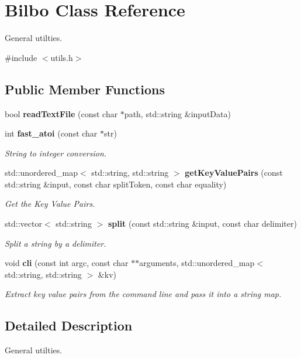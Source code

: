 \section{Bilbo Class Reference}
\label{class_bilbo}


General utilties.  




{\ttfamily \#include $<$utils.\+h$>$}

\subsection*{Public Member Functions}
\begin{DoxyCompactItemize}
\item 
bool \textbf{ read\+Text\+File} (const char $\ast$path, std\+::string \&input\+Data)
\item 
int \textbf{ fast\+\_\+atoi} (const char $\ast$str)
\begin{DoxyCompactList}\small\item\em String to integer conversion. \end{DoxyCompactList}\item 
std\+::unordered\+\_\+map$<$ std\+::string, std\+::string $>$ \textbf{ get\+Key\+Value\+Pairs} (const std\+::string \&input, const char split\+Token, const char equality)
\begin{DoxyCompactList}\small\item\em Get the Key Value Pairs. \end{DoxyCompactList}\item 
std\+::vector$<$ std\+::string $>$ \textbf{ split} (const std\+::string \&input, const char delimiter)
\begin{DoxyCompactList}\small\item\em Split a string by a delimiter. \end{DoxyCompactList}\item 
void \textbf{ cli} (const int argc, const char $\ast$$\ast$arguments, std\+::unordered\+\_\+map$<$ std\+::string, std\+::string $>$ \&kv)
\begin{DoxyCompactList}\small\item\em Extract key value pairs from the command line and pass it into a string map. \end{DoxyCompactList}\end{DoxyCompactItemize}


\subsection{Detailed Description}
General utilties. 

